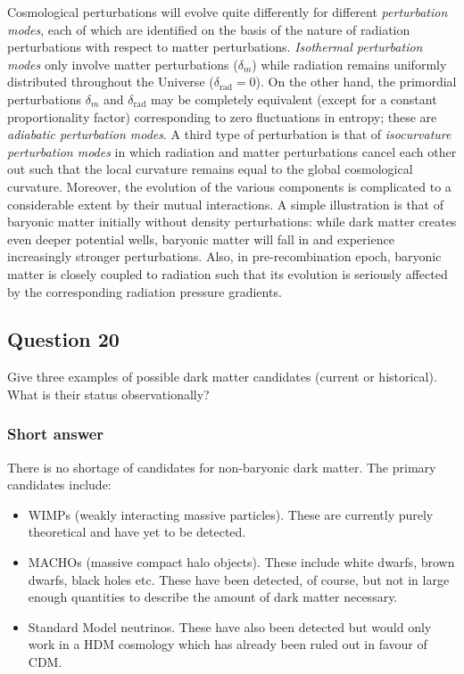 \documentclass[a4paper,11pt]{article}
\begin{document}
{\noindent}Cosmological perturbations will evolve quite differently for different \textit{perturbation modes}, each of which are identified on the basis of the nature of radiation perturbations with respect to matter perturbations. \textit{Isothermal perturbation modes} only involve matter perturbations ($\delta_m$) while radiation remains uniformly distributed throughout the 
Universe ($\delta_\mathrm{rad} = 0$). On the other hand, the primordial perturbations $\delta_m$ and $\delta_\mathrm{rad}$ may be completely equivalent (except for a constant proportionality factor) corresponding to zero fluctuations in entropy; these are \textit{adiabatic perturbation modes}. A third type of perturbation is that of \textit{isocurvature perturbation modes} in which radiation and matter perturbations cancel each other out such that the local curvature remains equal to the global cosmological curvature. Moreover, the evolution of the various components is complicated to a considerable extent by their mutual interactions. A simple illustration is that of baryonic matter initially without density perturbations: while dark matter creates even deeper potential wells, baryonic matter will fall in and experience increasingly stronger perturbations. Also, in pre-recombination epoch, baryonic matter is closely coupled to radiation such that its evolution is seriously affected by the corresponding radiation pressure gradients.

%
%

\newpage
\subsection{Question 20}

Give three examples of possible dark matter candidates (current or historical). What is their status observationally?

\subsubsection{Short answer}

There is no shortage of candidates for non-baryonic dark matter. The primary candidates include:

\begin{itemize}
    \item WIMPs (weakly interacting massive particles). These are currently purely theoretical and have yet to be detected.
    \item MACHOs (massive compact halo objects). These include white dwarfs, brown dwarfs, black holes etc. These have been detected, of course, but not in large enough quantities to describe the amount of dark matter necessary.
    \item Standard Model neutrinos. These have also been detected but would only work in a HDM cosmology which has already been ruled out in favour of CDM.
\end{itemize}
\end{document}
